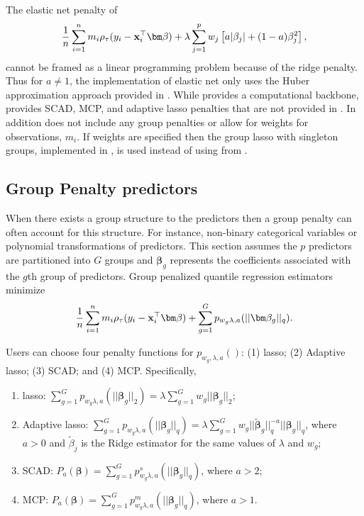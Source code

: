 The elastic net penalty of
\begin{equation}
\frac{1}{n} \sum_{i=1}^n m_i \rho_\tau(y_i - {\bf x}_i^\top\bm \beta) + \lambda \sum_{j=1}^p w_j \left[ a|\beta_j|+(1-a)\beta_j^2\right],
\label{eq:enet}
\end{equation}
cannot be framed as a linear programming problem because of the ridge penalty. Thus for \(a \neq 1\), the  implementation of elastic net only uses the Huber approximation approach provided in . While  provides a computational backbone,  provides SCAD, MCP, and adaptive lasso penalties that are not provided in . In addition  does not include any group penalties or allow for weights for observations, \(m_i\). If weights are specified then the group lasso with singleton groups, implemented in , is used instead of using  from .

\subsection{Group Penalty predictors}\label{group-penalty-predictors}

When there exists a group structure to the predictors then a group penalty can often account for this structure. For instance, non-binary categorical variables or polynomial transformations of predictors. This section assumes the \(p\) predictors are partitioned into \(G\) groups and \(\bm \beta_g\) represents the coefficients associated with the \(g\)th group of predictors. Group penalized quantile regression estimators minimize
\begin{equation}
\frac{1}{n} \sum_{i=1}^n m_i \rho_\tau(y_i - {\bf x}_i^\top\bm \beta) + \sum_{g=1}^G p_{w_g\lambda,a}(||\bm \beta_g||_q).
\label{eq:groupForm}
\end{equation}

Users can choose four penalty functions for \(p_{w_g,\lambda,a}()\): (1) lasso; (2) Adaptive lasso; (3) SCAD; and (4) MCP. Specifically,

\begin{enumerate}
\item lasso: $\sum_{g=1}^G p_{w_g\lambda,a}(||\bm \beta_g||_2)=\lambda \sum_{g=1}^G w_g ||\bm \beta_g||_2$;
\item Adaptive lasso: $\sum_{g=1}^G p_{w_g\lambda,a}(||\bm \beta_g||_q)= \lambda \sum_{g=1}^G w_g ||\tilde{\bm \beta}_g||_q^{-a} ||\bm \beta_g||_q$, where $a>0$ and $\tilde{\beta}_j$ is the Ridge estimator for the same values of $\lambda$ and $w_g$;
\item SCAD: $P_a(\bm \beta) = \sum_{g=1}^G p^s_{w_g\lambda,a}(||\bm \beta_g||_q)$, where $a>2$;
\item MCP: $P_a(\bm \beta) = \sum_{g=1}^G p^m_{w_g\lambda,a}(||\bm \beta_g||_q)$, where $a>1$.
\end{enumerate}

